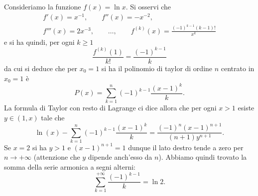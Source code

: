 \begin{example}
Consideriamo la funzione $f(x) = \ln x$.
Si osservi che
\begin{gather*}
  f'(x) = x^{-1},\qquad
  f''(x) = -x^{-2},\\
  f'''(x) = 2x^{-3}, \qquad
  \dots, \qquad
  f^{(k)}(x) = \frac{(-1)^{k-1}(k-1)!}{x^k}
\end{gather*}
e si ha quindi, per ogni $k\ge 1$
\[
  \frac{f^{(k)}(1)}{k!} = \frac{(-1)^{k-1}}{k}
\]
da cui si deduce che per $x_0=1$ si ha il polinomio di taylor di ordine $n$
centrato in $x_0=1$ è
\[
P(x) = \sum_{k=1}^n (-1)^{k-1}\frac{(x-1)^k}{k}.
\]
La formula di Taylor con resto di Lagrange ci dice allora che per
ogni $x>1$ esiste $y\in(1,x)$ tale che
\[
  \ln(x) - \sum_{k=1}^n (-1)^{k-1}\frac{(x-1)^k}{k} = \frac{(-1)^n(x-1)^{n+1}}{(n+1)y^{n+1}}.
\]
Se $x=2$ si ha $y>1$ e $(x-1)^{n+1}=1$ dunque
il lato destro tende a zero per $n\to +\infty$ (attenzione che $y$ dipende anch'esso da $n$). Abbiamo quindi trovato la somma della serie armonica
a segni alterni:
\[
  \sum_{k=1}^{+\infty} \frac{(-1)^{k-1}}{k} = \ln 2.
\]
\end{example}

